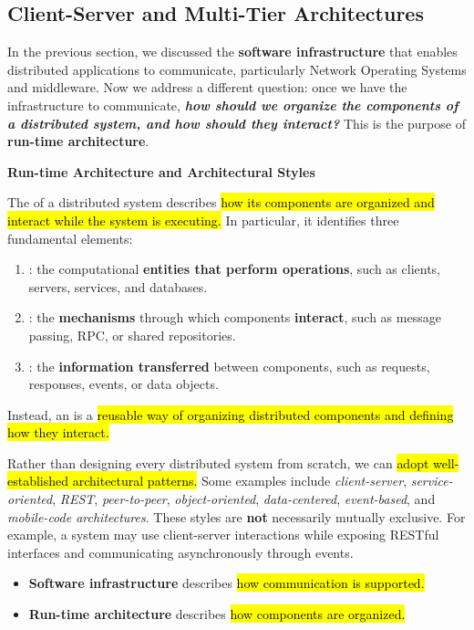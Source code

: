 \subsection{Client-Server and Multi-Tier Architectures}\label{sec:modeling--client-server-and-multi-tier-architectures}

In the previous section, we discussed the \textbf{software infrastructure} that enables distributed applications to communicate, particularly Network Operating Systems and middleware. Now we address a different question: once we have the infrastructure to communicate, \textbf{\emph{how should we organize the components of a distributed system, and how should they interact?}} This is the purpose of \textbf{run-time architecture}.

\highspace
\begin{flushleft}
    \textcolor{Green3}{ \textbf{Run-time Architecture and Architectural Styles}}
    \label{def:architectural-style}
\end{flushleft}
The  of a distributed system describes \hl{how its components are organized and interact while the system is executing.} In particular, it identifies three fundamental elements:
\begin{enumerate}
    \item {}: the computational \textbf{entities that perform operations}, such as clients, servers, services, and databases.
    \item {}: the \textbf{mechanisms} through which components \textbf{interact}, such as message passing, RPC, or shared repositories.
    \item {}: the \textbf{information transferred} between components, such as requests, responses, events, or data objects.
\end{enumerate}
Instead, an  is a \hl{reusable way of organizing distributed components and defining how they interact.}

\highspace
Rather than designing every distributed system from scratch, we can \hl{adopt well-established architectural patterns.} Some examples include \emph{client-server}, \emph{service-oriented}, \emph{REST}, \emph{peer-to-peer}, \emph{object-oriented}, \emph{data-centered}, \emph{event-based}, and \emph{mobile-code architectures}. These styles are \textbf{not} necessarily mutually exclusive. For example, a system may use client-server interactions while exposing RESTful interfaces and communicating asynchronously through events.
\begin{itemize}
    \item \textbf{Software infrastructure} describes \hl{how communication is supported.}
    \item \textbf{Run-time architecture} describes \hl{how components are organized.}
\end{itemize}

